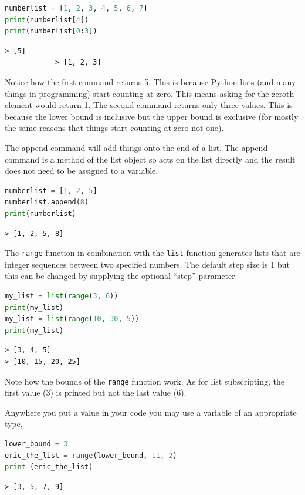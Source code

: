 		\begin{lstlisting}[language=Python]
numberlist = [1, 2, 3, 4, 5, 6, 7]
print(numberlist[4])
print(numberlist[0:3])\end{lstlisting}
		\begin{verbatim}> [5]
			> [1, 2, 3]
		\end{verbatim}
		Notice how the first command returns 5. This is because Python lists (and many things in programming) start counting at zero. This means asking for the zeroth element would return 1.
		The second command returns only three values. This is because the lower bound is inclusive but the upper bound is exclusive (for mostly the same reasons that things start counting at zero not one).

		The append command will add things onto the end of a list. The append command is a method of the list object so acts on the list directly and the result does not need to be assigned to a variable.
		\begin{lstlisting}[language=Python]
numberlist = [1, 2, 5]
numberlist.append(8)
print(numberlist)	\end{lstlisting}
		\begin{verbatim}> [1, 2, 5, 8]\end{verbatim}
		The \texttt{range} function in combination with the \texttt{list} function generates lists that are integer sequences between two specified numbers. The default step size is 1 but this can be changed by supplying the optional ``step'' parameter
\begin{lstlisting}[language=Python]
my_list = list(range(3, 6))
print(my_list)	
my_list = list(range(10, 30, 5))
print(my_list)
\end{lstlisting}
		\begin{verbatim}
> [3, 4, 5]
> [10, 15, 20, 25]\end{verbatim}
		Note how the bounds of the \texttt{range} function work. As for list subscripting, the first value (3) is printed but not the last value (6).

Anywhere you put a value in your code you may use a variable of an appropriate type,
\begin{lstlisting}[language=Python]
lower_bound = 3
eric_the_list = range(lower_bound, 11, 2)
print (eric_the_list)
\end{lstlisting}
		\begin{verbatim}
> [3, 5, 7, 9]\end{verbatim}
